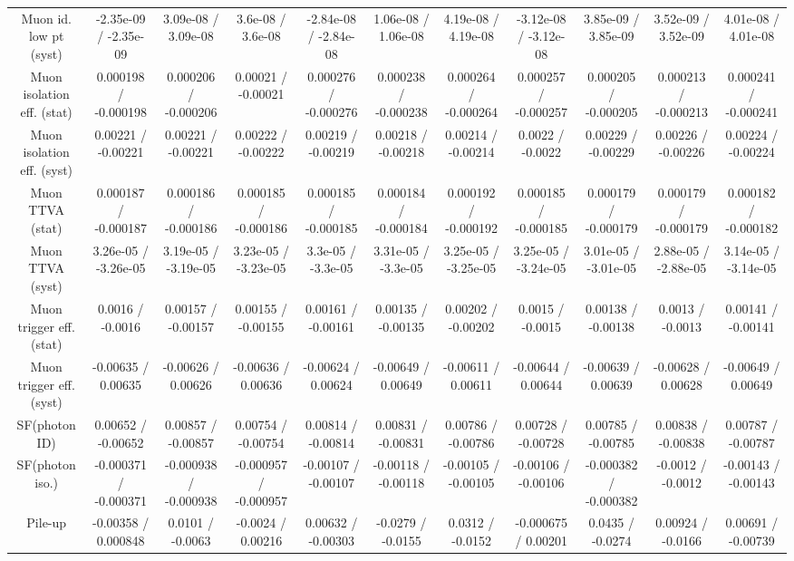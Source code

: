 \begin{table}[htbp]
\begin{center}
\begin{tabular}{|c|c|c|c|c|c|c|c|c|c|c|}
  Muon id. low pt (syst) & -2.35e-09 / -2.35e-09 & 3.09e-08 / 3.09e-08 & 3.6e-08 / 3.6e-08 & -2.84e-08 / -2.84e-08 & 1.06e-08 / 1.06e-08 & 4.19e-08 / 4.19e-08 & -3.12e-08 / -3.12e-08 & 3.85e-09 / 3.85e-09 & 3.52e-09 / 3.52e-09 & 4.01e-08 / 4.01e-08 \\ 
  Muon isolation eff. (stat) & 0.000198 / -0.000198 & 0.000206 / -0.000206 & 0.00021 / -0.00021 & 0.000276 / -0.000276 & 0.000238 / -0.000238 & 0.000264 / -0.000264 & 0.000257 / -0.000257 & 0.000205 / -0.000205 & 0.000213 / -0.000213 & 0.000241 / -0.000241 \\ 
  Muon isolation eff. (syst) & 0.00221 / -0.00221 & 0.00221 / -0.00221 & 0.00222 / -0.00222 & 0.00219 / -0.00219 & 0.00218 / -0.00218 & 0.00214 / -0.00214 & 0.0022 / -0.0022 & 0.00229 / -0.00229 & 0.00226 / -0.00226 & 0.00224 / -0.00224 \\ 
  Muon TTVA (stat) & 0.000187 / -0.000187 & 0.000186 / -0.000186 & 0.000185 / -0.000186 & 0.000185 / -0.000185 & 0.000184 / -0.000184 & 0.000192 / -0.000192 & 0.000185 / -0.000185 & 0.000179 / -0.000179 & 0.000179 / -0.000179 & 0.000182 / -0.000182 \\ 
  Muon TTVA (syst) & 3.26e-05 / -3.26e-05 & 3.19e-05 / -3.19e-05 & 3.23e-05 / -3.23e-05 & 3.3e-05 / -3.3e-05 & 3.31e-05 / -3.3e-05 & 3.25e-05 / -3.25e-05 & 3.25e-05 / -3.24e-05 & 3.01e-05 / -3.01e-05 & 2.88e-05 / -2.88e-05 & 3.14e-05 / -3.14e-05 \\ 
  Muon trigger eff. (stat) & 0.0016 / -0.0016 & 0.00157 / -0.00157 & 0.00155 / -0.00155 & 0.00161 / -0.00161 & 0.00135 / -0.00135 & 0.00202 / -0.00202 & 0.0015 / -0.0015 & 0.00138 / -0.00138 & 0.0013 / -0.0013 & 0.00141 / -0.00141 \\ 
  Muon trigger eff. (syst) & -0.00635 / 0.00635 & -0.00626 / 0.00626 & -0.00636 / 0.00636 & -0.00624 / 0.00624 & -0.00649 / 0.00649 & -0.00611 / 0.00611 & -0.00644 / 0.00644 & -0.00639 / 0.00639 & -0.00628 / 0.00628 & -0.00649 / 0.00649 \\ 
  SF(photon ID) & 0.00652 / -0.00652 & 0.00857 / -0.00857 & 0.00754 / -0.00754 & 0.00814 / -0.00814 & 0.00831 / -0.00831 & 0.00786 / -0.00786 & 0.00728 / -0.00728 & 0.00785 / -0.00785 & 0.00838 / -0.00838 & 0.00787 / -0.00787 \\ 
  SF(photon iso.) & -0.000371 / -0.000371 & -0.000938 / -0.000938 & -0.000957 / -0.000957 & -0.00107 / -0.00107 & -0.00118 / -0.00118 & -0.00105 / -0.00105 & -0.00106 / -0.00106 & -0.000382 / -0.000382 & -0.0012 / -0.0012 & -0.00143 / -0.00143 \\ 
  Pile-up & -0.00358 / 0.000848 & 0.0101 / -0.0063 & -0.0024 / 0.00216 & 0.00632 / -0.00303 & -0.0279 / -0.0155 & 0.0312 / -0.0152 & -0.000675 / 0.00201 & 0.0435 / -0.0274 & 0.00924 / -0.0166 & 0.00691 / -0.00739 \\ 

\end{tabular}
\end{center}
\end{table}
